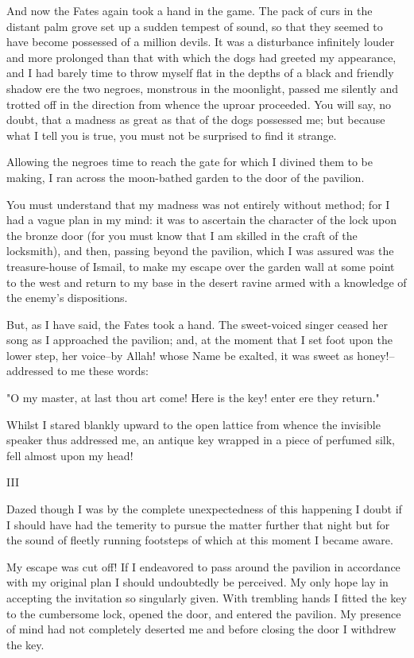And now the Fates again took a hand in the game. The pack of curs in
the distant palm grove set up a sudden tempest of sound, so that they
seemed to have become possessed of a million devils. It was a
disturbance infinitely louder and more prolonged than that with which
the dogs had greeted my appearance, and I had barely time to throw
myself flat in the depths of a black and friendly shadow ere the two
negroes, monstrous in the moonlight, passed me silently and trotted
off in the direction from whence the uproar proceeded. You will say,
no doubt, that a madness as great as that of the dogs possessed me;
but because what I tell you is true, you must not be surprised to find
it strange.

Allowing the negroes time to reach the gate for which I divined them
to be making, I ran across the moon-bathed garden to the door of the
pavilion.

You must understand that my madness was not entirely without method;
for I had a vague plan in my mind: it was to ascertain the character
of the lock upon the bronze door (for you must know that I am skilled
in the craft of the locksmith), and then, passing beyond the pavilion,
which I was assured was the treasure-house of Ismail, to make my
escape over the garden wall at some point to the west and return to
my base in the desert ravine armed with a knowledge of the enemy's
dispositions.

But, as I have said, the Fates took a hand. The sweet-voiced singer
ceased her song as I approached the pavilion; and, at the moment that
I set foot upon the lower step, her voice--by Allah! whose Name be
exalted, it was sweet as honey!--addressed to me these words:

"O my master, at last thou art come! Here is the key! enter ere they
return."

Whilst I stared blankly upward to the open lattice from whence the
invisible speaker thus addressed me, an antique key wrapped in a piece
of perfumed silk, fell almost upon my head!


III

Dazed though I was by the complete unexpectedness of this happening
I doubt if I should have had the temerity to pursue the matter further
that night but for the sound of fleetly running footsteps of which at
this moment I became aware.

My escape was cut off! If I endeavored to pass around the pavilion in
accordance with my original plan I should undoubtedly be perceived. My
only hope lay in accepting the invitation so singularly given. With
trembling hands I fitted the key to the cumbersome lock, opened the
door, and entered the pavilion. My presence of mind had not completely
deserted me and before closing the door I withdrew the key.

